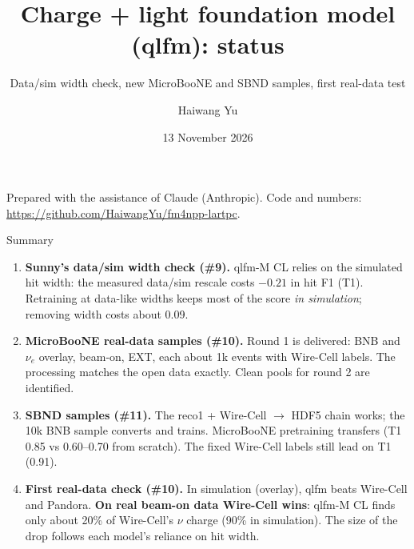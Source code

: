 \documentclass[aspectratio=169,10pt]{beamer}
\title{Charge + light foundation model (qlfm): status}
\subtitle{Data/sim width check, new MicroBooNE and SBND samples, first real-data test}
\author{Haiwang Yu}
\institute{fm4npp-lartpc \;\textbullet\; issues \iss{8}--\iss{11}}
\date{13 November 2026}
\newcommand{\bad}[1]{{\color{red!70!black}\textbf{#1}}}
\newcommand{\iss}[1]{{\color{blue!60!black}\##1}}
\begin{document}
\begin{frame}
  \titlepage
  \vfill
  {\tiny Prepared with the assistance of Claude (Anthropic). Code and numbers: \url{https://github.com/HaiwangYu/fm4npp-lartpc}.}
\end{frame}

\begin{frame}{Summary}
  \small
  \begin{enumerate}\setlength{\itemsep}{7pt}
    \item \textbf{Sunny's data/sim width check (\iss{9}).} qlfm-M CL relies on the simulated hit width:
      the measured data/sim rescale costs $-0.21$ in hit F1 (T1). Retraining at data-like widths keeps most of the
      score \emph{in simulation}; removing width costs about 0.09.
    \item \textbf{MicroBooNE real-data samples (\iss{10}).} Round 1 is delivered: BNB and $\nu_e$ overlay, beam-on, EXT,
      each about 1k events with Wire-Cell labels. The processing matches the open data exactly. Clean pools for round 2 are identified.
    \item \textbf{SBND samples (\iss{11}).} The reco1 + Wire-Cell $\rightarrow$ HDF5 chain works; the 10k BNB sample converts and trains.
      MicroBooNE pretraining transfers (T1 0.85 vs 0.60--0.70 from scratch). The fixed Wire-Cell labels still lead on T1 (0.91).
    \item \textbf{First real-data check (\iss{10}).} In simulation (overlay), qlfm beats Wire-Cell and Pandora.
      \bad{On real beam-on data Wire-Cell wins}: qlfm-M CL finds only about 20\% of Wire-Cell's $\nu$ charge (90\% in simulation).
      The size of the drop follows each model's reliance on hit width.
  \end{enumerate}
\end{frame}
\end{document}
